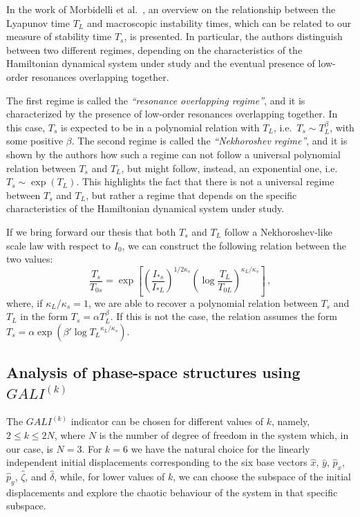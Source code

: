 In the work of Morbidelli et al.~\cite{Morbidelli1995}, an overview on the relationship between the Lyapunov time $T_L$ and macroscopic instability times, which can be related to our measure of stability time $T_s$, is presented. In particular, the authors distinguish between two different regimes, depending on the characteristics of the Hamiltonian dynamical system under study and the eventual presence of low-order resonances overlapping together.

The first regime is called the \textit{``resonance overlapping regime''}, and it is characterized by the presence of low-order resonances overlapping together. In this case, $T_s$ is expected to be in a polynomial relation with $T_L$, i.e.\ $T_s \sim T_L^\beta$, with some positive $\beta$. The second regime is called the \textit{``Nekhoroshev regime''}, and it is shown by the authors how such a regime can not follow a universal polynomial relation between $T_s$ and $T_L$, but might follow, instead, an exponential one, i.e.\ $T_s \sim \exp(T_L)$. This highlights the fact that there is not a universal regime between $T_s$ and $T_L$, but rather a regime that depends on the specific characteristics of the Hamiltonian dynamical system under study.

If we bring forward our thesis that both $T_s$ and $T_L$ follow a Nekhoroshev-like scale law with respect to $I_0$, we can construct the following relation between the two values:
\begin{equation}
    \frac{T_s}{T_{0s}} = \exp\left[\left(\frac{I_{\ast s}}{I_{\ast L}}\right)^{1/2\kappa_s}\left(\log\frac{T_L}{T_{0L}}\right)^{\kappa_L / \kappa_s}\right] \, ,
\end{equation}
where, if $\kappa_L/\kappa_s = 1$, we are able to recover a polynomial relation between $T_s$ and $T_L$ in the form $T_s = \alpha T_L^\beta$. If this is not the case, the relation assumes the form $T_s = \alpha \exp(\beta' \log{T_L}^{\kappa_L / \kappa_s})$.

\subsection{Analysis of phase-space structures using $GALI^{(k)}$}

The $GALI^{(k)}$ indicator can be chosen for different values of $k$, namely, $2 \leq k \leq 2N$, where $N$ is the number of degree of freedom in the system which, in our case, is $N=3$. For $k=6$ we have the natural choice for the linearly independent initial displacements corresponding to the six base vectors $\hat{x}$, $\hat{y}$, $\hat{p}_x$, $\hat{p}_y$, $\hat{\zeta}$, and $\hat{\delta}$, while, for lower values of $k$, we can choose the subspace of the initial displacements and explore the chaotic behaviour of the system in that specific subspace.

